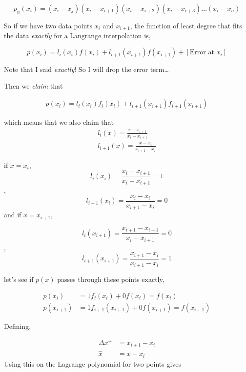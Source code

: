 \begin{equation*}
    p_n(x_i) =  \left( x_{i} - x_{j} \right) 
    \left( x_i - x_{i+1} \right)
    \left( x_i - x_{i+2} \right)
    \left( x_i - x_{i+3} \right) \dots
    ( x_i - x_n)
\end{equation*}

So if we have two data points $x_i$ and $x_{i+1}$, the function of least degree
that fits the data \textit{exactly} for a Langrange interpolation is,

\begin{equation*}
    p(x_i) = l_{i}(x_i)f(x_{i}) + l_{i+1}(x_{i+1})f(x_{i+1}) + \left[\text{
        Error at $x_i$}
    \right]
\end{equation*}

Note that I said \textit{exactly}! So I will drop the error term\dots

Then we \textit{claim} that

\begin{align*}
    p(x_i) =  
    l_i\left( x_i\right)f_i\left( x_i\right) + 
    l_{i+1}\left( x_{i+1}\right)f_{i+1}\left( x_{i+1}\right) 
\end{align*}

which means that we also claim that
\begin{align*}
    l_i(x) = \frac{x - x_{i+1}}{x_{i} - x_{i+1}} \\
    l_{i+1}(x) = \frac{x - x_{i}}{x_{i+1} - x_{i}}
\end{align*}

if $x = x_i$,
\[ l_i(x_i) = \frac{x_i - x_{i+1}}{x_i - x_{i+1} }= 1\], 
\[l_{i + 1}(x_i) = \frac{x_i-x_i}{x_{i+1} - x_{i}} = 0\]
and 
if $x = x_{i+1}$,

\[ l_i(x_{i+1}) = \frac{x_{i+1} - x_{i+1}}{x_i - x_{i+1} }= 0\], 
\[l_{i + 1}(x_{i+1}) = \frac{x_{i+1}-x_i}{x_{i+1} - x_{i}} = 1\]

let's see if $p\left( x \right)$ passes through these points exactly,

\begin{align*}
    p\left( x_i \right) &= 1 f_i(x_i) + 0 f\left( x_i  \right) =  f\left( x_i  \right) \\
    p\left( x_{i+1} \right) &= 1 f_{i+1}(x_{i+1}) + 0 f\left( x_{i+1}  \right) =  f\left( x_{i+1}  \right) 
\end{align*}

Defining,

\begin{align*}
    \Delta x^+ &= x_{i+1} - x_i \\
    \hat{x} &= x - x_i 
\end{align*}
Using this on the Lagrange polynomial for two points gives 


